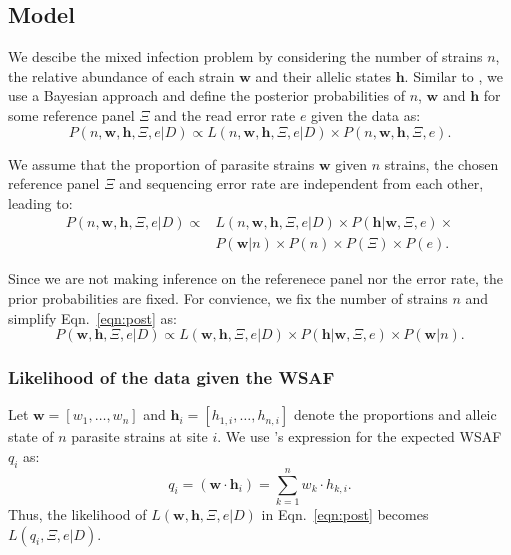 \documentclass{bioinfo}
\begin{document}
\subsection{Model}
We descibe the mixed infection problem by considering the number of strains $n$, the relative abundance of each strain $\mathbf{w}$ and their allelic states $\mathbf{h}$. Similar to \citet{Jack2016}, we use a Bayesian approach and define the posterior probabilities of $n$, $\mathbf{w}$ and $\mathbf{h}$ for some reference panel $\Xi$ and the read error rate $e$ given the data as:
$$P(n, \mathbf{w}, \mathbf{h}, \Xi, e |D) \propto L(n, \mathbf{w}, \mathbf{h}, \Xi, e|D) \times P(n, \mathbf{w}, \mathbf{h}, \Xi, e).$$

We assume that the proportion of parasite strains $\mathbf{w}$ given $n$ strains, the chosen reference panel $\Xi$ and sequencing error rate are independent from each other, leading to:
\begin{equation}
\begin{split}
P(n, \mathbf{w}, \mathbf{h}, \Xi, e|D) \propto & L(n, \mathbf{w}, \mathbf{h}, \Xi, e | D) \times P(\mathbf{h}|\mathbf{w}, \Xi, e) \times \\
                                               & P(\mathbf{w}|n) \times P(n) \times P(\Xi) \times P(e).\label{eqn:post:old}
\end{split}
\end{equation}

Since we are not making inference on the referenece panel nor the error rate, the prior probabilities are fixed. For convience, we fix the number of strains $n$ and simplify Eqn.~\eqref{eqn:post} as:
\begin{equation}
P(\mathbf{w}, \mathbf{h}, \Xi, e |D) \propto L(\mathbf{w}, \mathbf{h}, \Xi, e|D) \times P(\mathbf{h}|\mathbf{w}, \Xi, e) \times P(\mathbf{w}|n). \label{eqn:post}
\end{equation}

\subsubsection{Likelihood of the data given the WSAF}
Let $\mathbf w = [w_1,\dots, w_n]$ and $\mathbf{h}_i = [h_{1,i},\dots,h_{n,i}]$ denote the proportions and alleic state of $n$ parasite strains at site $i$. We use \citet{Jack2016}'s expression for the expected WSAF $q_{i}$ as:
\begin{equation}
q_i= (\mathbf{w}\cdot\mathbf{h}_{i})  =  \sum_{k=1}^{n} w_k \cdot h_{k,i} .\label{eqn:qij_full_sum}
\end{equation}
Thus, the likelihood of $L(\mathbf{w}, \mathbf{h},\Xi, e|D)$ in Eqn.~\eqref{eqn:post} becomes $L(q_{i},\Xi, e|D)$.
\end{document}
